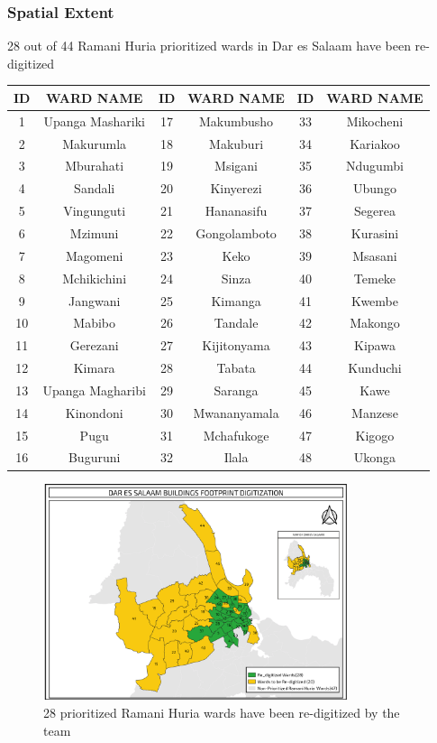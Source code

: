 \documentclass[a4paper,12pt,twoside]{article}
\begin{document}
\subsubsection{Spatial Extent}
28 out of 44 Ramani Huria prioritized wards in Dar es Salaam have been re-digitized

\begin{center}
\begin{tabular}{|c|c|c|c|c|c|}
\hline
ID & WARD NAME & ID & WARD NAME & ID & WARD NAME\\
\hline
1 & Upanga Mashariki & 17  & Makumbusho & 33  & Mikocheni\\
2 &  Makurumla & 18 &  Makuburi & 34  & Kariakoo\\
3 &  Mburahati & 19  & Msigani & 35  & Ndugumbi\\
4 &  Sandali & 20  & Kinyerezi & 36  & Ubungo\\
5  & Vingunguti & 21  & Hananasifu & 37  & Segerea\\
6 &  Mzimuni & 22  & Gongolamboto & 38  & Kurasini\\
7  & Magomeni & 23  & Keko & 39  & Msasani\\
8  & Mchikichini & 24  & Sinza & 40  & Temeke\\
9  & Jangwani & 25  & Kimanga & 41  & Kwembe\\
10  & Mabibo & 26  & Tandale & 42  & Makongo\\
11  & Gerezani & 27  & Kijitonyama & 43  & Kipawa\\
12  & Kimara & 28  & Tabata & 44  & Kunduchi\\
13 &  Upanga Magharibi & 29  & Saranga & 45  & Kawe\\
14 &  Kinondoni & 30  & Mwananyamala & 46  & Manzese\\
15 &  Pugu & 31  & Mchafukoge & 47  & Kigogo\\
16 &  Buguruni & 32  & Ilala & 48  & Ukonga\\
 \hline
\end{tabular}
\end{center}

\begin{figure}[h]
  \caption{28 prioritized Ramani Huria wards have been re-digitized by the team}
  \centering
 \includegraphics[width=0.8\textwidth]{images/Building_Footprint_Digitization.png}
\end{figure}
\end{document}
